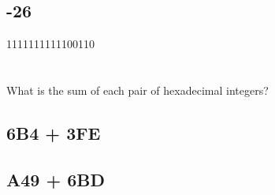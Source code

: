 \documentclass{article}
\begin{document}
\subsection{-26}
1111111111100110

\section{}
What is the sum of each pair of hexadecimal integers?

\subsection{6B4 + 3FE}

\subsection{A49 + 6BD}
\end{document}
